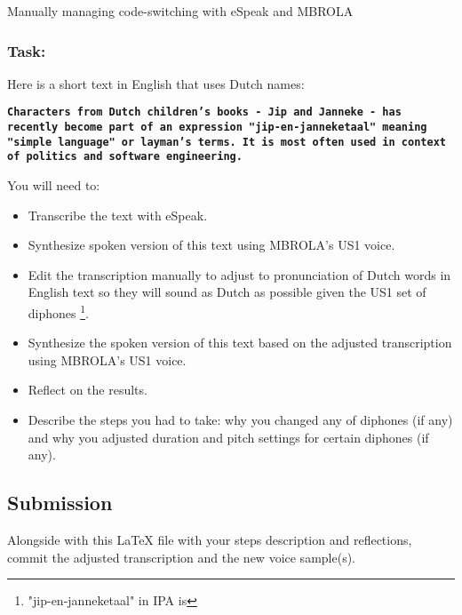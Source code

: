 \documentclass{../labbook}
\begin{document}
\begin{problem}{2}{10}{Manually managing code-switching with eSpeak and MBROLA}
\subsubsection*{Task:}
\noindent Here is a short text in English that uses Dutch names: 

\textbf{\texttt{Characters from Dutch children's books - Jip and Janneke - has recently become part of an expression "jip-en-janneketaal" meaning "simple language" or layman's terms. It is most often used in context of politics and software engineering.}}
\smallskip

You will need to:
\begin{itemize}
    \item Transcribe the text with eSpeak.
    \item Synthesize spoken version of this text using MBROLA's US1 voice.
    \item Edit the transcription manually to adjust to pronunciation of Dutch words in English text so they will sound as Dutch as possible given the US1 set of diphones \footnote{"jip-en-janneketaal" in IPA is }.
    \item Synthesize the spoken version of this text based on the adjusted transcription using MBROLA's US1 voice.
    \item Reflect on the results.
    \item Describe the steps you had to take: why you changed any of diphones (if any) and why you adjusted duration and pitch settings for certain diphones (if any). 
\end{itemize}
\subsection*{Submission}
\noindent Alongside with this LaTeX file with your steps description and reflections, commit the adjusted transcription and the new voice sample(s).
\end{problem}
\end{document}
